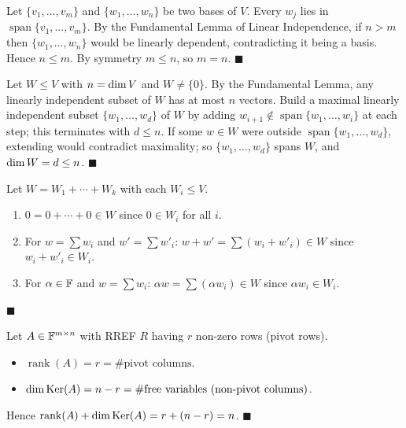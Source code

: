 \begin{proofbox}
Let $\{v_1,\ldots,v_m\}$ and $\{w_1,\ldots,w_n\}$ be two bases of $V$.
Every $w_j$ lies in $\operatorname{span}\{v_1,\ldots,v_m\}$.  By the
Fundamental Lemma of Linear Independence, if $n>m$ then
$\{w_1,\ldots,w_n\}$ would be linearly dependent, contradicting it being a
basis.  Hence $n\le m$.  By symmetry $m\le n$, so $m=n$. \hfill$\blacksquare$
\end{proofbox}

\begin{proofbox}
Let $W\le V$ with $n=\operatorname{dim} V$ and $W\neq\{0\}$.  By the Fundamental
Lemma, any linearly independent subset of $W$ has at most $n$ vectors.
Build a maximal linearly independent subset $\{w_1,\ldots,w_d\}$ of $W$
by adding $w_{i+1}\notin\operatorname{span}\{w_1,\ldots,w_i\}$ at each step;
this terminates with $d\le n$.  If some $w\in W$ were outside
$\operatorname{span}\{w_1,\ldots,w_d\}$, extending would contradict
maximality; so $\{w_1,\ldots,w_d\}$ spans $W$, and $\operatorname{dim} W=d\le n$.
\hfill$\blacksquare$
\end{proofbox}

\begin{proofbox}
Let $W=W_1+\cdots+W_k$ with each $W_i\le V$.
\begin{enumerate}[label=\textbf{(\roman*)}]
    \item $0=0+\cdots+0\in W$ since $0\in W_i$ for all $i$.
    \item For $w=\sum w_i$ and $w'=\sum w'_i$:
          $w+w'=\sum(w_i+w'_i)\in W$ since $w_i+w'_i\in W_i$.
    \item For $\alpha\in\mathbb{F}$ and $w=\sum w_i$:
          $\alpha w=\sum(\alpha w_i)\in W$ since $\alpha w_i\in W_i$.
\end{enumerate}
\hfill$\blacksquare$
\end{proofbox}

\begin{proofbox}
Let $A\in\mathbb{F}^{m\times n}$ with RREF $R$ having $r$ non-zero rows
(pivot rows).
\begin{itemize}
    \item $\operatorname{rank}(A)=r=\#\text{pivot columns}$.
    \item $\operatorname{dim}\operatorname{Ker}(A)=n-r=\#\text{free variables (non-pivot columns)}$.
\end{itemize}
Hence $\operatorname{rank}(A)+\operatorname{dim}\operatorname{Ker}(A)=r+(n-r)=n$. \hfill$\blacksquare$
\end{proofbox}

